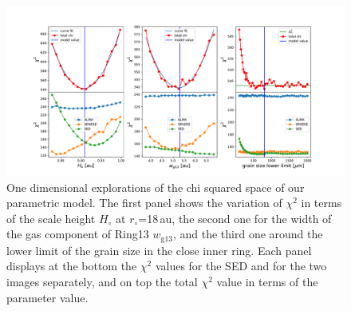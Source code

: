 \documentclass[fleqn,usenatbib,useAMS]{mnras}
\begin{document}
\begin{figure}
	\includegraphics[width=\textwidth]{plot_chi_squared_all800.pdf}
        \caption{One dimensional explorations of the chi squared space of our parametric model. The first panel shows the variation of $\chi^2$ in terms of the scale height $H_\circ$ at $r_\circ$=18\,au, the second one for the width of the gas component of Ring13 $w_{\mathrm{g13}}$, and the third one around the lower limit of the grain size in the close inner ring. Each panel displays at the bottom the $\chi^2$ values for the SED and for the two images separately, and on top the total $\chi^2$ value in terms of the parameter value.}
    \label{fig:chi}
\end{figure}




\bsp	%
\label{lastpage}
\end{document}
